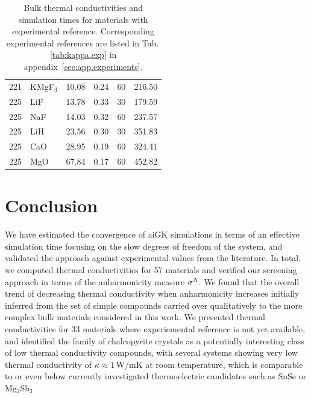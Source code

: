 \begin{table}[ht]
\begin{tabularx}{\linewidth}{rXXXrr}
         221 &     KMgF$_3$ &            10.08 &       0.24 &         60 &     216.50 \\
         225 &          LiF &            13.78 &       0.33 &         30 &     179.59 \\
         225 &          NaF &            14.03 &       0.32 &         60 &     237.57 \\
         225 &          LiH &            23.56 &       0.30 &         30 &     351.83 \\
         225 &          CaO &            28.95 &       0.19 &         60 &     324.41 \\
         225 &          MgO &            67.84 &       0.17 &         60 &     452.82 \\
\bottomrule
\end{tabularx}
  \caption{Bulk thermal conductivities and simulation times for materials with experimental reference. Corresponding experimental references are listed in Tab.\,\ref{tab:kappa.exp} in appendix~\ref{sec:app.experiments}.}
  \label{tab:kappa.w/exp}
\end{table}

\section{Conclusion}
We have estimated the convergence of aiGK simulations in terms of an effective simulation time focusing on the slow degrees of freedom of the system, and validated the approach against experimental values from the literature. In total, we computed thermal conductivities for 57 materials and verified our screening approach in terms of the anharmonicity measure $\sigma^\mathrm{A}$. We found that the overall trend of decreasing thermal conductivity when anharmonicity increases initially inferred from the set of simple compounds carried over qualitatively to the more complex bulk materials considered in this work. We presented thermal conductivities for 33 materials where experiemental reference is not yet available, and identified the family of chalcopyrite crystals as a potentially interesting class of low thermal conductivity compounds, with several systems showing very low thermal conductivity of $\kappa \approx 1$\,W/mK at room temperature, which is comparable to or even below currently investigated thermoelectric candidates such as SnSe or Mg$_2$Sb$_3$~\cite{Zhao.2014,Wei.2016,Sassi.2014,Pan.2020,kajikawa2003,Condron.2006,Zhang.2009,Zhang.2018,Ding.2021}

